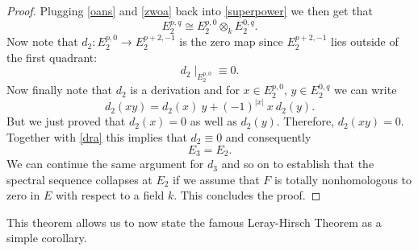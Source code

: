 \begin{proof}
    Plugging \ref{oans} and \eqref{zwoa} back into \eqref{superpower} we then get that 
    \begin{equation}\label{dra}
        E_2^{p,q}\cong  E^{p,0}_2 \otimes_k  E^{0, q}_2 .
    \end{equation}
    Now note that $d_2: E_2^{p,0}\to E^{p+2,-1}_2$ is the zero map since $E^{p+2,-1}_2$ lies outside of the first quadrant:
    \begin{equation*}
        d_2\mid_{E^{p,0}_2} \equiv 0.
    \end{equation*}
    Now finally note that $d_2$ is a derivation and  for $x\in E^{p,0}_2$, $y\in E^{0,q}_2$ we can write
    \begin{equation*}
        d_2(xy) = d_2(x)\ y + (-1)^{|x|}\ x\ d_2(y).
    \end{equation*}
    But we just proved that $d_2(x)=0$ as well as $d_2(y)$. Therefore, $d_2(xy) = 0$. Together with \eqref{dra} this implies that $d_2 \equiv 0$ and consequently
    \begin{equation*}
        E_3 = E_2.
    \end{equation*}
    We can continue the same argument for $d_3$ and so on to establish that the spectral sequence collapses at $E_2$ if we assume that $F$ is totally nonhomologous to zero in $E$ with respect to a field $k$. This concludes the proof.
    
    
\end{proof}

This theorem allows us to now state the famous Leray-Hirsch Theorem as a simple corollary.

